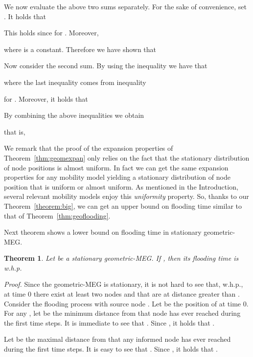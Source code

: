 \documentclass[10pt,a4paper]{article}
\newtheorem{theorem}[definition]{Theorem}
\newcommand{\proof}{\noindent\textit{Proof. }}
\newcommand{\qed}{\hspace{\stretch{1}}}
\begin{document}
\noindent We now evaluate the above two sums separately. For the sake of convenience, set . It
holds that


\noindent This holds since  for . Moreover,



\noindent where  is a constant. Therefore we have shown that


\noindent Now consider the second sum. By using the inequality  we have
that

\noindent where the last inequality comes from inequality

for . Moreover, it holds that



\noindent By combining the above inequalities we obtain


\noindent that is,

\qed




\noindent We remark that the proof of the expansion properties of Theorem~\ref{thm:geomexpan} only relies on the fact that the stationary distribution of node positions is almost uniform. In fact we can get the same expansion properties for any mobility model yielding a stationary distribution of node position that is uniform or almost uniform. As mentioned in the Introduction, several relevant mobility models enjoy this \emph{uniformity} property. So, thanks to our Theorem~\ref{theorem:big}, we can get an upper bound on flooding time similar to that of Theorem~\ref{thm:geoflooding}.

\noindent Next theorem shows a lower bound on flooding time in stationary geometric-MEG.

\begin{theorem}\label{thm:geolb}
Let  be a stationary geometric-MEG. If , then its 
flooding time is w.h.p.

\end{theorem}
\proof Since the geometric-MEG is stationary, it is not hard to see that, w.h.p., at time 0 there exist at least two nodes  and  that are at distance greater than . Consider the flooding process with source node . Let  be the position of  at time 0. For any , let  be the minimum distance from  that node  has ever reached during the first  time steps. It is immediate to see that . Since , it holds that .

\noindent Let  be the maximal distance from    that any informed node has ever reached during the first  time steps. It is easy to see that . Since , it holds that .
\end{document}
